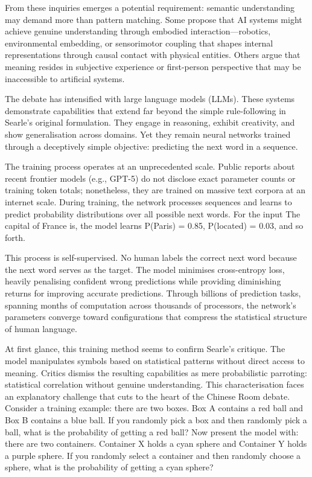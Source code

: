 From these inquiries emerges a potential requirement: semantic understanding may demand more than pattern matching. Some propose that AI systems might achieve genuine understanding through embodied interaction—robotics, environmental embedding, or sensorimotor coupling that shapes internal representations through causal contact with physical entities. Others argue that meaning resides in subjective experience or first-person perspective that may be inaccessible to artificial systems.

The debate has intensified with large language models (LLMs). These systems demonstrate capabilities that extend far beyond the simple rule-following in Searle's original formulation. They engage in reasoning, exhibit creativity, and show generalisation across domains. Yet they remain neural networks trained through a deceptively simple objective: predicting the next word in a sequence.

The training process operates at an unprecedented scale. Public reports about recent frontier models (e.g., GPT-5) do not disclose exact parameter counts or training token totals; nonetheless, they are trained on massive text corpora at an internet scale. During training, the network processes sequences and learns to predict probability distributions over all possible next words. For the input \QSOpen{}The capital of France is,\QSClose{} the model learns P(\QSOpen{}Paris\QSClose{}) = 0.85, P(\QSOpen{}located\QSClose{}) = 0.03, and so forth.

This process is self-supervised. No human labels the \QSOpen{}correct\QSClose{} next word because the next word serves as the target. The model minimises cross-entropy loss, heavily penalising confident wrong predictions while providing diminishing returns for improving accurate predictions. Through billions of prediction tasks, spanning months of computation across thousands of processors, the network's parameters converge toward configurations that compress the statistical structure of human language.

At first glance, this training method seems to confirm Searle's critique. The model manipulates symbols based on statistical patterns without direct access to meaning. Critics dismiss the resulting capabilities as \QSOpen{}mere probabilistic parroting\QSClose{}: statistical correlation without genuine understanding. This characterisation faces an explanatory challenge that cuts to the heart of the Chinese Room debate. Consider a training example: \QSOpen{}there are two boxes. Box A contains a red ball and Box B contains a blue ball. If you randomly pick a box and then randomly pick a ball, what is the probability of getting a red ball?\QSClose{} Now present the model with: \QSOpen{}there are two containers. Container X holds a cyan sphere and Container Y holds a purple sphere. If you randomly select a container and then randomly choose a sphere, what is the probability of getting a cyan sphere?\QSClose{}

